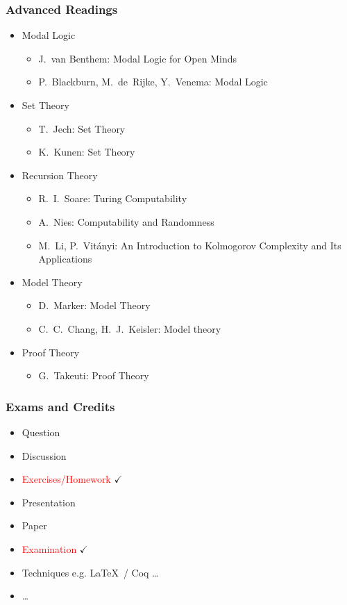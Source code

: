 \documentclass[UTF8,aspectratio=43,11pt,colorlinks,compress,openany]{beamer}%
\begin{document}
\begin{frame}\frametitle{Advanced Readings}
\begin{itemize}
	\item Modal Logic
		\begin{itemize}
			\item J.~van Benthem: Modal Logic for Open Minds
			\item P.~Blackburn, M.~de~Rijke, Y.~Venema: Modal Logic
		\end{itemize}
	\item Set Theory
		\begin{itemize}
			\item T.~Jech: Set Theory
			\item K.~Kunen: Set Theory
		\end{itemize}
	\item Recursion Theory
		\begin{itemize}
			\item R.~I.~Soare: Turing Computability
			\item A.~Nies: Computability and Randomness
			\item M.~Li, P.~Vit\'anyi: An Introduction to Kolmogorov Complexity and Its Applications
		\end{itemize}
	\item Model Theory
		\begin{itemize}
			\item D.~Marker: Model Theory
			\item C.~C.~Chang, H.~J.~Keisler: Model theory
		\end{itemize}
	\item Proof Theory
		\begin{itemize}
			\item G.~Takeuti: Proof Theory
		\end{itemize}
\end{itemize}
\end{frame}

\begin{frame}\frametitle{Exams and Credits}
	\begin{itemize}
		\item Question
		\item Discussion
		\item \textcolor{red}{Exercises/Homework} $\checkmark$
		\item Presentation
		\item Paper
		\item \textcolor{red}{Examination} $\checkmark$
		\item Techniques e.g. \LaTeX\, / Coq \dots
		\item \dots
	\end{itemize}
\end{frame}
\end{document}
